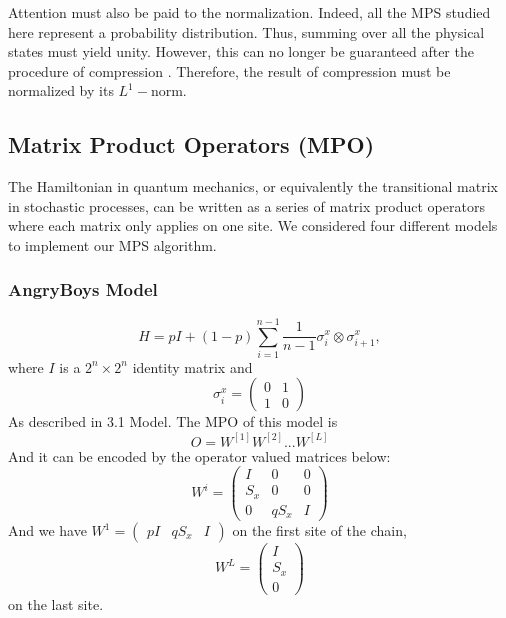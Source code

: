\documentclass[english]{article}
\begin{document}
Attention must also be paid to the normalization. Indeed, all the MPS studied here represent a probability distribution. Thus, summing over all the physical states must yield unity. However, this can no longer be guaranteed after the procedure of compression . Therefore, the result of compression must be normalized by its $L^1-$norm.


\subsection{Matrix Product Operators (MPO)}
The Hamiltonian in quantum mechanics, or equivalently the transitional matrix in stochastic processes, can be written as a series of matrix product operators where each matrix only applies on one site.
We considered four different models to implement our MPS algorithm.
\subsubsection{AngryBoys Model}
\begin{displaymath}
H = pI + (1-p)\sum_{i=1}^{n-1}\frac{1}{n-1}\sigma_i^x\otimes\sigma_{i+1}^x,
\end{displaymath}
where $I$ is a $2^n\times2^n$ identity matrix and 
\begin{displaymath}
\sigma_i^x = 
\begin{pmatrix}
0 & 1 \\
1 & 0
\end{pmatrix}
\end{displaymath}
As described in 3.1 Model.
The MPO of this model is 
$$
O=W^{[1]}W^{[2]} ... W^{[L]}
$$
And it can be encoded by the operator valued matrices below:
$$
W^{i}=
\begin{pmatrix}
I & 0 & 0 \\
S_x & 0 & 0 \\
0 & qS_x & I
\end{pmatrix}
$$
And  we have $W^1=\begin{pmatrix}p I & q S_x & I\end{pmatrix}$ on the first site of the chain, 
$$W^L=\begin{pmatrix}
I \\ S_x \\ 0
\end{pmatrix}$$
on the last site.
\end{document}
